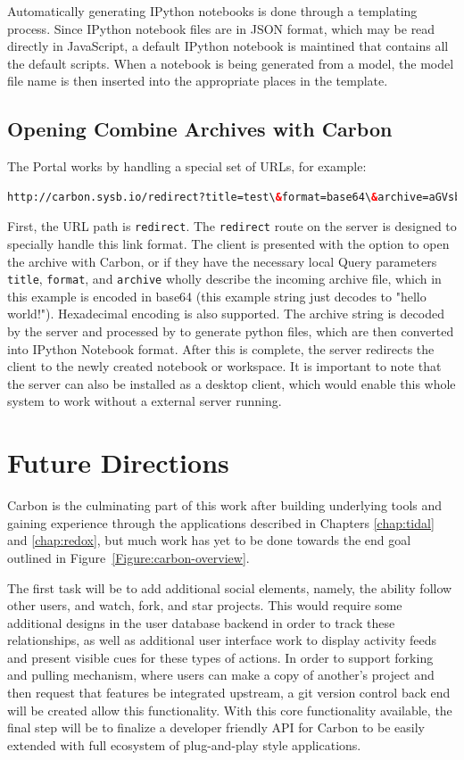 Automatically generating IPython notebooks is done through a templating process.
Since IPython notebook files are in JSON format, which may be read directly in JavaScript, a default IPython notebook is maintined that contains all the default scripts.
When a notebook is being generated from a model, the model file name is then inserted into the appropriate places in the template.

\subsection{Opening Combine Archives with Carbon}
The Portal works by handling a special set of URLs, for example: 

\begin{lstlisting}[language=html]
http://carbon.sysb.io/redirect?title=test\&format=base64\&archive=aGVsbG8gd29ybGQ=
\end{lstlisting}

First, the URL path is \texttt{redirect}. The \texttt{redirect} route on the server is designed to specially handle this link format.
The client is presented with the option to open the archive with Carbon, or if they have the necessary local
Query parameters \texttt{title}, \texttt{format}, and \texttt{archive} wholly describe the incoming archive file, which in this example is encoded in base64 (this example string just decodes to "hello world!").
Hexadecimal encoding is also supported.
The archive string is decoded by the server and processed by \autocite{sysbio2014sedml2py} to generate python files, which are then converted into IPython Notebook format.
After this is complete, the server redirects the client to the newly created notebook or workspace.
It is important to note that the server can also be installed as a desktop client, which would enable this whole system to work without a external server running.

\section{Future Directions}

Carbon is the culminating part of this work after building underlying tools and gaining experience through the applications described in Chapters \ref{chap:tidal} and \ref{chap:redox}, but much work has yet to be done towards the end goal outlined in Figure~\ref{Figure:carbon-overview}.

The first task will be to add additional social elements, namely, the ability follow other users, and watch, fork, and star projects.
This would require some additional designs in the user database backend in order to track these relationships, as well as additional user interface work to display activity feeds and present visible cues for these types of actions.
In order to support forking and pulling mechanism, where users can make a copy of another's project and then request that features be integrated upstream, a git version control back end will be created allow this functionality.
With this core functionality available, the final step will be to finalize a developer friendly API for Carbon to be easily extended with full ecosystem of plug-and-play style applications.


